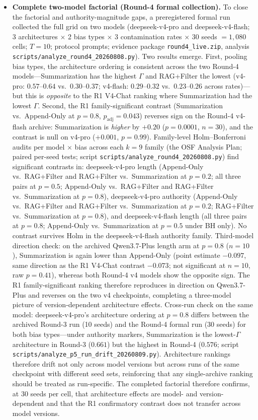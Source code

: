 \documentclass[11pt]{article}
\begin{document}
\begin{itemize}[nosep]
    \item \textbf{Complete two-model factorial (Round-4 formal collection).} To close the factorial and authority-magnitude gaps, a preregistered formal run collected the full grid on two models (deepseek-v4-pro and deepseek-v4-flash; 3 architectures $\times$ 2 bias types $\times$ 3 contamination rates $\times$ 30 seeds $= 1{,}080$ cells; $T{=}10$; protocol prompts; evidence package \texttt{round4\_live.zip}, analysis \texttt{scripts/analyze\_round4\_20260808.py}). Two results emerge. First, pooling bias types, the architecture ordering is consistent across the two Round-4 models---Summarization has the highest $\Gamma$ and RAG+Filter the lowest (v4-pro: $0.57$--$0.64$ vs.\ $0.30$--$0.37$; v4-flash: $0.29$--$0.32$ vs.\ $0.23$--$0.26$ across rates)---but this is \emph{opposite} to the R1 V4-Chat ranking where Summarization had the lowest $\Gamma$. Second, the R1 family-significant contrast (Summarization vs.\ Append-Only at $p{=}0.8$, $p_{\text{adj}}{=}0.043$) reverses sign on the Round-4 v4-flash archive: Summarization is \emph{higher} by $+0.20$ ($p{=}0.0001$, $n{=}30$), and the contrast is null on v4-pro ($+0.001$, $p{=}0.99$). Family-level Holm--Bonferroni audits per model $\times$ bias across each $k{=}9$ family (the OSF Analysis Plan; paired per-seed tests; script \texttt{scripts/analyze\_round4\_20260808.py}) find significant contrasts in: deepseek-v4-pro length (Append-Only vs.\ RAG+Filter and RAG+Filter vs.\ Summarization at $p{=}0.2$; all three pairs at $p{=}0.5$; Append-Only vs.\ RAG+Filter and RAG+Filter vs.\ Summarization at $p{=}0.8$), deepseek-v4-pro authority (Append-Only vs.\ RAG+Filter and RAG+Filter vs.\ Summarization at $p{=}0.2$; RAG+Filter vs.\ Summarization at $p{=}0.8$), and deepseek-v4-flash length (all three pairs at $p{=}0.8$; Append-Only vs.\ Summarization at $p{=}0.5$ under BH only). No contrast survives Holm in the deepseek-v4-flash authority family. Third-model direction check: on the archived Qwen3.7-Plus length arm at $p{=}0.8$ ($n{=}10$), Summarization is again lower than Append-Only (point estimate $-0.097$, same direction as the R1 V4-Chat contrast $-0.073$; not significant at $n{=}10$, raw $p{=}0.41$), whereas both Round-4 v4 models show the opposite sign. The R1 family-significant ranking therefore reproduces in direction on Qwen3.7-Plus and reverses on the two v4 checkpoints, completing a three-model picture of version-dependent architecture effects. Cross-run check on the same model: deepseek-v4-pro's architecture ordering at $p{=}0.8$ differs between the archived Round-3 run (10 seeds) and the Round-4 formal run (30 seeds) for both bias types---under authority markers, Summarization is the lowest-$\Gamma$ architecture in Round-3 ($0.661$) but the highest in Round-4 ($0.576$; script \texttt{scripts/analyze\_p5\_run\_drift\_20260809.py}). Architecture rankings therefore drift not only across model versions but across runs of the same checkpoint with different seed sets, reinforcing that any single-archive ranking should be treated as run-specific. The completed factorial therefore confirms, at 30 seeds per cell, that architecture effects are model- and version-dependent and that the R1 confirmatory contrast does not transfer across model versions.

\end{itemize}
\end{document}
